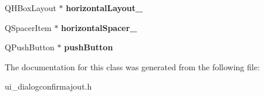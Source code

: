\begin{DoxyCompactItemize}
\item 
\hypertarget{classUi__DialogConfirmAjout_adfa200390347da38f3f484b63ed0d56f}{Q\-H\-Box\-Layout $\ast$ {\bfseries horizontal\-Layout\-\_}}\label{classUi__DialogConfirmAjout_adfa200390347da38f3f484b63ed0d56f}

\item 
\hypertarget{classUi__DialogConfirmAjout_a6d79b56d9e1489f29f758f6badcaf037}{Q\-Spacer\-Item $\ast$ {\bfseries horizontal\-Spacer\-\_}}\label{classUi__DialogConfirmAjout_a6d79b56d9e1489f29f758f6badcaf037}

\item 
\hypertarget{classUi__DialogConfirmAjout_a1b8afe913fcaca4a47045ac4d467acd5}{Q\-Push\-Button $\ast$ {\bfseries push\-Button}}\label{classUi__DialogConfirmAjout_a1b8afe913fcaca4a47045ac4d467acd5}

\end{DoxyCompactItemize}


The documentation for this class was generated from the following file\-:\begin{DoxyCompactItemize}
\item 
ui\-\_\-dialogconfirmajout.\-h\end{DoxyCompactItemize}
